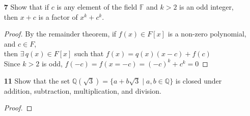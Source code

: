 \documentclass[paper=usletter, fontsize=12pt]{article}
\begin{document}
\begin{itemize}
\begin{enumerate}
\begin{proof}
                By Fermat's little theorem, for any prime $p$ and $x$ such that
                $p \nmid x$,
                \begin{equation*}
                    x^{p-1}\equiv 1 \Mod{p}
                \end{equation*}
                Since $\{0,1,2,\ldots,p-1\}\in\mathbb{Z}_p$, and there are no
                elements in $\mathbb{Z}_p$ that divides $p$,\\
                then $x^{q-1}\equiv 1 \Mod{p}$ for all $q(\neq
                p)\in\mathbb{Z}_p$
                Therefore, all of $\mathbb{Z}_p$ are roots of the polynomial \qedhere

            \end{proof}

            \item[\textbf{7}] Show that if $c$ is any element of the field
            $\mathbb{F}$ and $k>2$ is an odd integer, then $x+c$ is a factor of
            $x^k+c^k$.
            \begin{proof}

                By the remainder theorem, if $f(x)\in F[x]$ is a non-zero
                polynomial, and $c \in F$, \\ then $\exists\, q(x) \in F[x]$ such
                that $f(x)=q(x)(x-c)+f(c)$\\
                Since $k>2$ is odd, $f(-c)=f(x=-c)=(-c)^k+c^k=0$ \qedhere

            \end{proof}

            \item[\textbf{11}] Show that the set
            $\mathbb{Q}(\sqrt{3})=\{a+b\sqrt{3}\mid a,b \in \mathbb{Q}\}$ is
            closed under addition, subtraction, multiplication, and division.
            \begin{proof}


\end{proof}
\end{enumerate}
\end{itemize}
\end{document}
